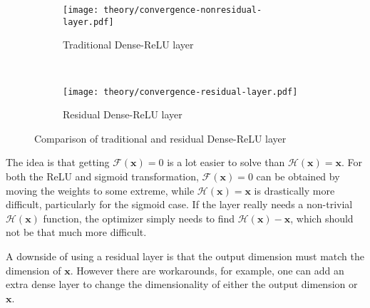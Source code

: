 \begin{figure}[H]
    \centering
    \begin{subfigure}[b]{0.4\textwidth}
        \centering
        \texttt{[image: theory/convergence-nonresidual-layer.pdf]}
        \caption{Traditional Dense-ReLU layer}
    \end{subfigure}
    ~ %
    \begin{subfigure}[b]{0.4\textwidth}
        \centering
        \texttt{[image: theory/convergence-residual-layer.pdf]}
        \caption{Residual Dense-ReLU layer}
    \end{subfigure}
    \caption{Comparison of traditional and residual Dense-ReLU layer}
\end{figure}

The idea is that getting $\mathcal{F}(\mathbf{x}) = 0$ is a lot easier to solve than $\mathcal{H}(\mathbf{x}) = \mathbf{x}$. For both the ReLU and sigmoid transformation, $\mathcal{F}(\mathbf{x}) = 0$ can be obtained by moving the weights to some extreme, while $\mathcal{H}(\mathbf{x}) = \mathbf{x}$ is drastically more difficult, particularly for the sigmoid case. If the layer really needs a non-trivial $\mathcal{H}(\mathbf{x})$ function, the optimizer simply needs to find $\mathcal{H}(\mathbf{x}) - \mathbf{x}$, which should not be that much more difficult.

A downside of using a residual layer is that the output dimension must match the dimension of $\mathbf{x}$. However there are workarounds, for example, one can add an extra dense layer to change the dimensionality of either the output dimension or $\mathbf{x}$.